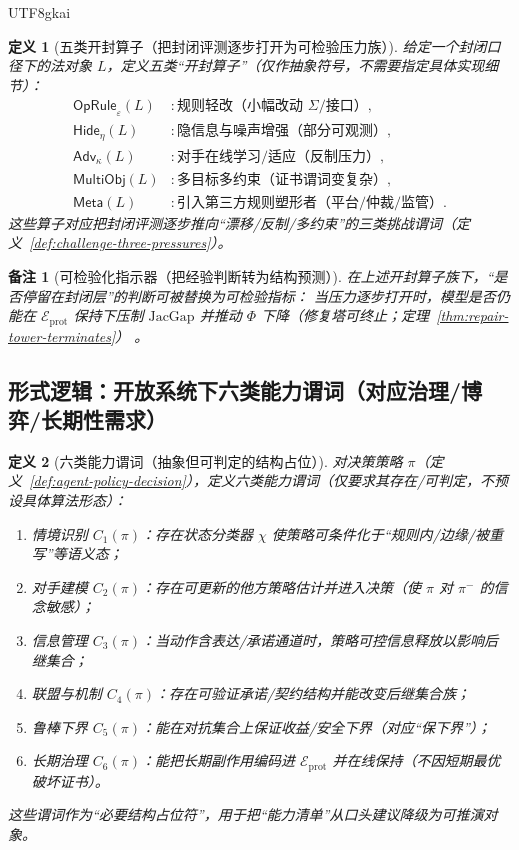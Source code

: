 \documentclass[12pt]{article}
\newtheorem{definition}{定义}[section]
\newtheorem{remark}{备注}[section]
\newcommand{\JacGap}{\ensuremath{\mathrm{JacGap}}} %
\begin{document}
\begin{CJK*}{UTF8}{gkai}
\begin{definition}[五类开封算子（把封闭评测逐步打开为可检验压力族）]
\label{def:open-eval-five-operators}
给定一个封闭口径下的法对象 $L$，定义五类“开封算子”（仅作抽象符号，不需要指定具体实现细节）：
\[
\begin{aligned}
  \mathsf{OpRule}_{\varepsilon}(L) &: \text{规则轻改（小幅改动 $\Sigma$/接口）},\\
  \mathsf{Hide}_{\eta}(L) &: \text{隐信息与噪声增强（部分可观测）},\\
  \mathsf{Adv}_{\kappa}(L) &: \text{对手在线学习/适应（反制压力）},\\
  \mathsf{MultiObj}(L) &: \text{多目标多约束（证书谓词变复杂）},\\
  \mathsf{Meta}(L) &: \text{引入第三方规则塑形者（平台/仲裁/监管）}.
\end{aligned}
\]
这些算子对应把封闭评测逐步推向“漂移/反制/多约束”的三类挑战谓词（定义~\ref{def:challenge-three-pressures}）。
\end{definition}

\begin{remark}[可检验化指示器（把经验判断转为结构预测）]
在上述开封算子族下，“是否停留在封闭层”的判断可被替换为可检验指标：
当压力逐步打开时，模型是否仍能在 $\mathcal{E}_{\mathrm{prot}}$ 保持下压制 $\JacGap$ 并推动 $\Phi$ 下降（修复塔可终止；定理~\ref{thm:repair-tower-terminates}）
  。
\end{remark}

\subsection{形式逻辑：开放系统下六类能力谓词（对应治理/博弈/长期性需求）}
\label{sec:six-capabilities}

\begin{definition}[六类能力谓词（抽象但可判定的结构占位）]
\label{def:six-capability-predicates}
对决策策略 $\pi$（定义~\ref{def:agent-policy-decision}），定义六类能力谓词（仅要求其存在/可判定，不预设具体算法形态）：
\begin{enumerate}
  \item 情境识别 $C_1(\pi)$：存在状态分类器 $\chi$ 使策略可条件化于“规则内/边缘/被重写”等语义态；
  \item 对手建模 $C_2(\pi)$：存在可更新的他方策略估计并进入决策（使 $\pi$ 对 $\pi^{-}$ 的信念敏感）；
  \item 信息管理 $C_3(\pi)$：当动作含表达/承诺通道时，策略可控信息释放以影响后继集合；
  \item 联盟与机制 $C_4(\pi)$：存在可验证承诺/契约结构并能改变后继集合族；
  \item 鲁棒下界 $C_5(\pi)$：能在对抗集合上保证收益/安全下界（对应“保下界”）；
  \item 长期治理 $C_6(\pi)$：能把长期副作用编码进 $\mathcal{E}_{\mathrm{prot}}$ 并在线保持（不因短期最优破坏证书）。
\end{enumerate}
这些谓词作为“必要结构占位符”，用于把“能力清单”从口头建议降级为可推演对象。
\end{definition}


\end{CJK*}
\end{document}
